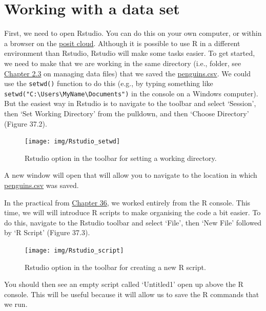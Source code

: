 \documentclass[
]{scrbook}
\begin{document}
\hypertarget{working-with-a-data-set}{%
\section{Working with a data set}\label{working-with-a-data-set}}

First, we need to open Rstudio.
You can do this on your own computer, or within a browser on the \href{https://posit.cloud/}{posit cloud}.
Although it is possible to use R in a different environment than Rstudio, Rstudio will make some tasks easier.
To get started, we need to make that we are working in the same directory (i.e., folder, see \protect\hyperlink{managing-data-files}{Chapter 2.3} on managing data files) that we saved the \href{https://raw.githubusercontent.com/bradduthie/SCIU4T4/main/data/penguins.csv}{penguins.csv}.
We could use the \texttt{setwd()} function to do this (e.g., by typing something like \texttt{setwd("C:\textbackslash{}Users\textbackslash{}MyName\textbackslash{}Documents")} in the console on a Windows computer).
But the easiest way in Rstudio is to navigate to the toolbar and select `Session', then `Set Working Directory' from the pulldown, and then `Choose Directory' (Figure 37.2).

\begin{figure}
\texttt{[image: img/Rstudio\_setwd]} \caption{Rstudio option in the toolbar for setting a working directory.}\label{fig:unnamed-chunk-220}
\end{figure}

A new window will open that will allow you to navigate to the location in which \href{https://raw.githubusercontent.com/bradduthie/SCIU4T4/main/data/penguins.csv}{penguins.csv} was saved.

In the practical from \protect\hyperlink{Chapter_36}{Chapter 36}, we worked entirely from the R console.
This time, we will will introduce R scripts to make organising the code a bit easier.
To do this, navigate to the Rstudio toolbar and select `File', then `New File' followed by `R Script' (Figure 37.3).

\begin{figure}
\texttt{[image: img/Rstudio\_script]} \caption{Rstudio option in the toolbar for creating a new R script.}\label{fig:unnamed-chunk-221}
\end{figure}

You should then see an empty script called `Untitled1' open up above the R console.
This will be useful because it will allow us to save the R commands that we run.
\end{document}
